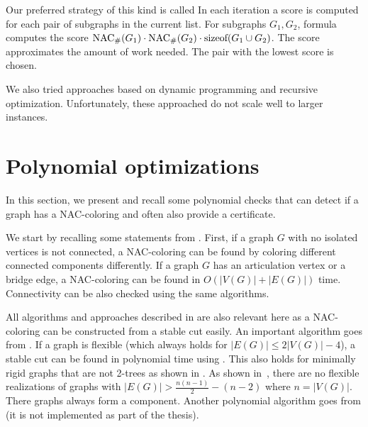 Our preferred strategy of this kind is called \Score{}
In each iteration a score is computed for each pair of subgraphs in the current list.
For subgraphs \( G_1, G_2 \), formula computes the score
\( \operatorname{NAC}_{\#} (G_1) \cdot \operatorname{NAC}_{\#} (G_2) \cdot \text{sizeof}(G_1 \cup G_2) \).
The score approximates the amount of work needed.
The pair with the lowest score is chosen.

We also tried approaches based on dynamic programming and recursive optimization.
Unfortunately, these approached do not scale well to larger instances.


\section{Polynomial optimizations}%
\label{sec:polynomial_optimizations}

In this section, we present and recall some polynomial checks
that can detect if a graph has a NAC-coloring and often also provide a certificate.

We start by recalling some statements from .
%
First, if a graph \( G \) with no isolated vertices is not connected,
a NAC-coloring can be found by coloring different connected components differently.
%
If a graph \( G \) has an articulation vertex or a bridge edge,
a NAC-coloring can be found in \( O(|V(G)|+|E(G)|) \) time.
Connectivity can be also checked using the same algorithms.

All algorithms and approaches described in 
are also relevant here as a NAC-coloring can be constructed from a stable cut easily.
An important algorithm goes from .
If a graph is flexible (which always holds for \( |E(G)| \le 2|V(G)|-4 \)),
a stable cut can be found in polynomial time using .
This also holds for minimally rigid graphs that are not 2-trees as shown in .
%
As shown in~\cite{legersky_original}, there are no flexible realizations
of graphs with \( |E(G)| > \frac{n(n-1)}{2} - (n-2) \) where \( n = |V(G)| \).
There graphs always form a \trcon{} component.
%
Another polynomial algorithm goes from 
(it is not implemented as part of the thesis).

